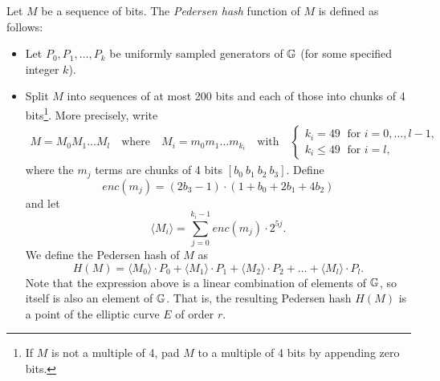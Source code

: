 Let $M$ be a sequence of bits. %
The {\it Pedersen hash} function of $M$ is defined as follows:
\begin{itemize}
	\item Let $P_0,P_1,\dots,P_k$ be uniformly sampled generators of $\mathbb{G}$ (for some specified integer $k$). 
	\item   Split $M$ into sequences of at most 200 bits and each of those into chunks of 4 bits{\footnote{If $M$ is not a multiple of 4, pad $M$ to a multiple of 4 bits by appending zero bits.}}. 
	More precisely, write  
	\begin{gather*}
		M = M_0M_1\dots M_l 
		\quad\text{where}\quad
		M_i = m_0m_1\dots m_{k_i}
		\quad\text{with}\quad 
		\begin{cases}
			k_i = 49 	\;\text{ for }  i = 0, \dots, l-1, \\
			k_i \leq 49 \;\text{ for }  i = l,
		\end{cases}
	\end{gather*}
	where the $m_j$ terms are chunks of 4 bits $[b_0\: b_1\: b_2\: b_3]$. 
	Define  
	$$ enc(m_j) = (2b_3-1) 
		\cdot (1+b_{0}+2b_{1}+4b_{2}) $$
	and let 
	$$ \langle M_i \rangle = \sum_{j=0}^{k_i-1} enc(m_j) \cdot 2^{5j}.	$$
	We define the Pedersen hash of $M$ as
	\begin{equation}
	\label{eq-ped}
		H(M) = \langle M_0 \rangle \cdot P_0 
		+  \langle M_1 \rangle \cdot P_1 
		+  \langle M_2 \rangle \cdot P_2 
		+ \dots + \langle M_l \rangle \cdot P_l.	
	\end{equation}
	Note that the expression above is a linear combination of elements of $\mathbb{G}$, 
	so itself is also an element of $\mathbb{G}$. 
	That is, the resulting Pedersen hash $H(M)$ is a point of the elliptic curve $E$ of order $r$.
\end{itemize}